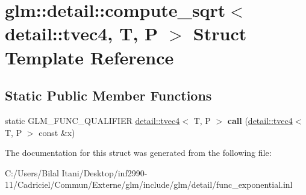 \hypertarget{structglm_1_1detail_1_1compute__sqrt_3_01detail_1_1tvec4_00_01_t_00_01_p_01_4}{}\section{glm\+:\+:detail\+:\+:compute\+\_\+sqrt$<$ detail\+:\+:tvec4, T, P $>$ Struct Template Reference}
\label{structglm_1_1detail_1_1compute__sqrt_3_01detail_1_1tvec4_00_01_t_00_01_p_01_4}
\subsection*{Static Public Member Functions}
\begin{DoxyCompactItemize}
\item 
static G\+L\+M\+\_\+\+F\+U\+N\+C\+\_\+\+Q\+U\+A\+L\+I\+F\+I\+ER \hyperlink{structglm_1_1detail_1_1tvec4}{detail\+::tvec4}$<$ T, P $>$ {\bfseries call} (\hyperlink{structglm_1_1detail_1_1tvec4}{detail\+::tvec4}$<$ T, P $>$ const \&x)\hypertarget{structglm_1_1detail_1_1compute__sqrt_3_01detail_1_1tvec4_00_01_t_00_01_p_01_4_a75a6bf4911534e88541e66391ffb3f6e}{}\label{structglm_1_1detail_1_1compute__sqrt_3_01detail_1_1tvec4_00_01_t_00_01_p_01_4_a75a6bf4911534e88541e66391ffb3f6e}

\end{DoxyCompactItemize}


The documentation for this struct was generated from the following file\+:\begin{DoxyCompactItemize}
\item 
C\+:/\+Users/\+Bilal Itani/\+Desktop/inf2990-\/11/\+Cadriciel/\+Commun/\+Externe/glm/include/glm/detail/func\+\_\+exponential.\+inl\end{DoxyCompactItemize}
